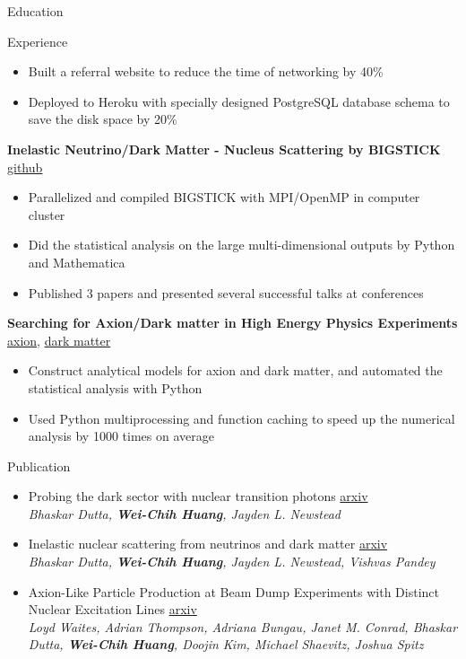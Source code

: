 \documentclass{resume}
\begin{document}
\begin{rSection}{Education}
\begin{rSection}{Experience}
\begin{itemize}
        \itemsep -3pt {}
        \item Built a referral website to reduce the time of networking by 40\%
        \item Deployed to Heroku with specially designed PostgreSQL database schema to save the disk space by 20\%
        \end{itemize}
    \item \textbf{Inelastic Neutrino/Dark Matter - Nucleus Scattering by BIGSTICK} \hfill {\href{https://github.com/noctildon/Inelastic}{github}}
        \begin{itemize}
        \itemsep -3pt {}
        \item Parallelized and compiled BIGSTICK with MPI/OpenMP in computer cluster
        \item Did the statistical analysis on the large multi-dimensional outputs by Python and Mathematica
        \item Published 3 papers and presented several successful talks at conferences
        \end{itemize}
    \item \textbf{Searching for Axion/Dark matter in High Energy Physics Experiments} \hfill {\href{https://github.com/noctildon/alplib}{axion}}, {\href{https://github.com/noctildon/lightDM}{dark matter}}
        \begin{itemize}
        \itemsep -3pt {}
        \item Construct analytical models for axion and dark matter, and automated the statistical analysis with Python
        \item Used Python multiprocessing and function caching to speed up the numerical analysis by 1000 times on average
        \end{itemize}
\end{rSection}


\begin{rSection}{Publication}
    \begin{itemize}
        \item Probing the dark sector with nuclear transition photons \hfill \href{https://arxiv.org/pdf/2302.10250.pdf}{arxiv}\\
        {\footnotesize \it Bhaskar Dutta, \textbf{Wei-Chih Huang}, Jayden L. Newstead}
        \item Inelastic nuclear scattering from neutrinos and dark matter \hfill \href{https://arxiv.org/pdf/2206.08590.pdf}{arxiv}\\
        {\footnotesize \it Bhaskar Dutta, \textbf{Wei-Chih Huang}, Jayden L. Newstead, Vishvas Pandey}
        \item Axion-Like Particle Production at Beam Dump Experiments with Distinct Nuclear Excitation Lines \hfill \href{https://arxiv.org/pdf/2207.13659.pdf}{arxiv}\\
        {\footnotesize \it Loyd Waites, Adrian Thompson, Adriana Bungau, Janet M. Conrad, Bhaskar Dutta, \textbf{Wei-Chih Huang}, Doojin Kim, Michael Shaevitz, Joshua Spitz}
    \end{itemize}
\end{rSection}



\end{rSection}
\end{document}
